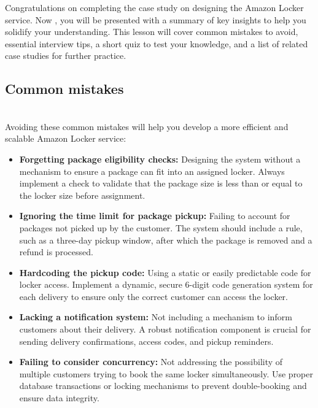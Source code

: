 

Congratulations on completing the case study on designing the Amazon Locker service. Now , you will be presented with a summary of key insights to help you solidify your understanding. This lesson will cover common mistakes to avoid, essential interview tips, a short quiz to test your knowledge, and a list of related case studies for further practice.

\subsection{Common mistakes}\label{YiT29rL6n7Hvm0w7NBvdv}
\\
Avoiding these common mistakes will help you develop a more efficient and scalable Amazon Locker service:

\begin{itemize}
\item
\protect{}\label{_PCF9GyQcTLctZNGqKTSn}
\textbf{Forgetting package eligibility checks:} Designing the system without a mechanism to ensure a package can fit into an assigned locker. Always implement a check to validate that the package size is less than or equal to the locker size before assignment.
\item
\protect{}\label{0zG4vx3S9dLAXSIML4ckf}
\textbf{Ignoring the time limit for package pickup:} Failing to account for packages not picked up by the customer. The system should include a rule, such as a three-day pickup window, after which the package is removed and a refund is processed.
\item
\protect{}\label{B9MdlkmUIuCZpUHVgwqFz}
\textbf{Hardcoding the pickup code:} Using a static or easily predictable code for locker access. Implement a dynamic, secure 6-digit code generation system for each delivery to ensure only the correct customer can access the locker.
\item
\protect{}\label{nDCiB8K5NTlNffcuXq3sJ}
\textbf{Lacking a notification system:} Not including a mechanism to inform customers about their delivery. A robust notification component is crucial for sending delivery confirmations, access codes, and pickup reminders.
\item
\protect{}\label{YbIBBJpIiNHplN-iLY5NE}
\textbf{Failing to consider concurrency:} Not addressing the possibility of multiple customers trying to book the same locker simultaneously. Use proper database transactions or locking mechanisms to prevent double-booking and ensure data integrity.
\end{itemize}

